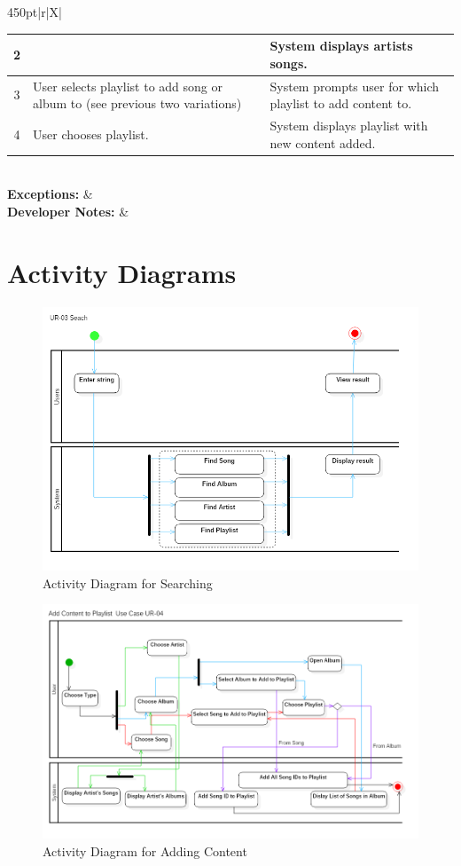 \documentclass[12pt]{article}
\begin{document}
\begin{center}
\begin{tabularx}{450pt}{|r|X|}
\begin{enumerate}[label=(\alph*)]
{\begin{tabularx}{296pt}{|c|X|X|}
						2 & & System displays artists songs.\\\hline
						3 & User selects playlist to add song or album to (see previous two variations) & System prompts user for which playlist to add content to. \\\hline
						4 & User chooses playlist. & System displays playlist with new content added. \\\hline
				\end{tabularx}} 
			\end{enumerate}\\\hline
			\textbf{Exceptions:} &  \\\hline
			\textbf{Developer Notes:} & \\\hline
		\end{tabularx}
	\end{center}
	\section{Activity Diagrams}
		\begin{figure}[H]
		\centering
		\includegraphics[scale=0.3]{SearchActivityDiagram}
		\caption{Activity Diagram for Searching}
		\label{fig:act1}
	\end{figure}
	\begin{figure}[H]
		\centering
		\includegraphics[scale=0.3]{ActivityDiagramAddContent}
		\caption{Activity Diagram for Adding Content}
		\label{fig:act2}
	\end{figure}
\end{document}
